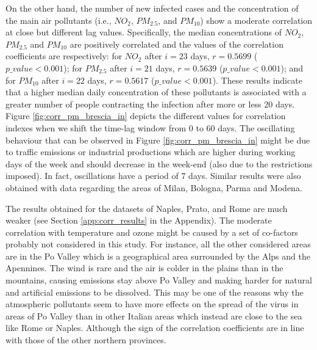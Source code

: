 \documentclass[review]{elsarticle}
\begin{document}
On the other hand, the number of new infected cases and the concentration of the main air pollutants (i.e., $NO_{2}$, $PM_{2.5}$, and $PM_{10}$) show a moderate correlation at close but different lag values. Specifically, the median concentrations of $NO_{2}$, $PM_{2.5}$ and $PM_{10}$ are positively correlated and the values of the correlation coefficients are respectively: for $NO_{2}$ after $i =23$ days, $r = 0.5699$ ($p\_value < 0.001$); for $PM_{2.5}$ after $i =21$ days, $r = 0.5639$ ($p\_value < 0.001$); and for $PM_{10}$ after $i=22$ days, $r = 0.5617$ ($p\_value < 0.001$). These results indicate that a higher median daily concentration of these pollutants is associated with a greater number of people contracting the infection after more or less 20 days. Figure \ref{fig:corr_pm_brescia_in} depicts the different values for correlation indexes when we shift the time-lag window from $0$ to $60$ days. The oscillating behaviour that can be observed in Figure \ref{fig:corr_pm_brescia_in} might be due to traffic emissions or industrial productions which are higher during working days of the week and should decrease in the week-end (also due to the restrictions imposed). In fact, oscillations have a period of 7 days.
Similar results were also obtained with data regarding the areas of Milan, Bologna, Parma and Modena. 

The results obtained for the datasets of Naples, Prato, and Rome are much weaker (see Section \ref{app:corr_results} in the Appendix). The moderate correlation with temperature and ozone might be caused by a set of co-factors probably not considered in this study. For instance, all the other considered areas are in the Po Valley which is a geographical area surrounded by the Alps and the Apennines. The wind is rare and the air is colder in the plains than in the mountains, causing emissions stay above Po Valley and making harder for natural and artificial emissions to be dissolved.  
This may be one of the reasons why the atmospheric pollutants seem to have more effects on the spread of the virus in areas of Po Valley than in other Italian areas which instead are close to the sea like Rome or Naples.
Although the sign of the correlation coefficients are in line with those of the other northern provinces. 
\end{document}
